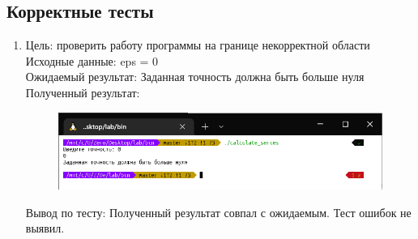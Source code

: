 \documentclass[a4paper]{article}
\begin{document}
	\subsection{Корректные тесты}
	\begin{enumerate}[label=\textbf{Тест \arabic*}]
		\item Цель: проверить работу программы на границе некорректной области \\
		Исходные данные: eps = 0 \\
		Ожидаемый результат: Заданная точность должна быть больше нуля \\
		Полученный результат:
		
		\begin{figure}[h]
			\includegraphics[width=\textwidth]{tests/test0.png}
		\end{figure}
		
		Вывод по тесту: Полученный результат совпал с ожидаемым. Тест ошибок не выявил.
		\vspace{5mm}
	\end{enumerate}
	
	
\end{document}
